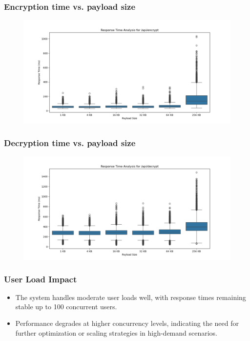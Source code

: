 \documentclass{beamer}
\begin{document}
\begin{frame}
    \frametitle{Encryption time vs. payload size}
    \begin{figure}
        \includegraphics[width=\textwidth,height=0.7\textheight,keepaspectratio]{images/phase2/response_time_api_encrypt.png}
    \end{figure}
\end{frame}

\begin{frame}
    \frametitle{Decryption time vs. payload size}
    \begin{figure}
        \includegraphics[width=\textwidth,height=0.7\textheight,keepaspectratio]{images/phase2/response_time_api_decrypt.png}
    \end{figure}
\end{frame}

\begin{frame}
    \frametitle{User Load Impact}
    \begin{itemize}
        \item The system handles moderate user loads well, with response times remaining stable up to 100 concurrent users.
        \item Performance degrades at higher concurrency levels, indicating the need for further optimization or scaling strategies in high-demand scenarios.
    \end{itemize}
\end{frame}
\end{document}
